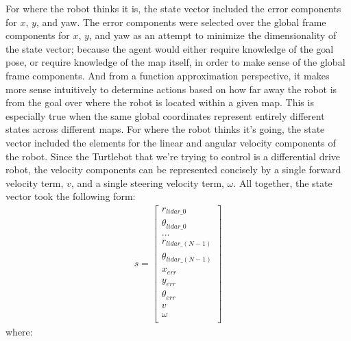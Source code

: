 \documentclass[conference]{IEEEtran}
\begin{document}
        For where the robot thinks it is, the state vector included the error components for $x$, $y$, and yaw. The error components were selected
        over the global frame components for $x$, $y$, and yaw as an attempt to minimize the dimensionality of the state vector; because the agent
        would either require knowledge of the goal pose, or require knowledge of the map itself, in order to make sense of the global frame components.
        And from a function approximation perspective, it makes more sense intuitively to determine actions based on how far away the robot is from
        the goal over where the robot is located within a given map. This is especially true when the same global coordinates represent entirely
        different states across different maps. For where the robot thinks it's going, the state vector included the elements for the linear and
        angular velocity components of the robot. Since the Turtlebot that we're trying to control is a differential drive robot, the velocity
        components can be represented concisely by a single forward velocity term, $v$, and a single steering velocity term, $\omega$. All together,
        the state vector took the following form:
        \begin{gather*}
            s =
            \begin{bmatrix}
                r_{lidar\_0}  \\
                \theta_{lidar\_0} \\
                ... \\
                r_{lidar\_(N-1)} \\
                \theta_{lidar\_(N-1)} \\
                x_{err} \\
                y_{err} \\
                \theta_{err} \\
                v \\
                \omega \\
            \end{bmatrix}
        \end{gather*}
        where:
\end{document}
